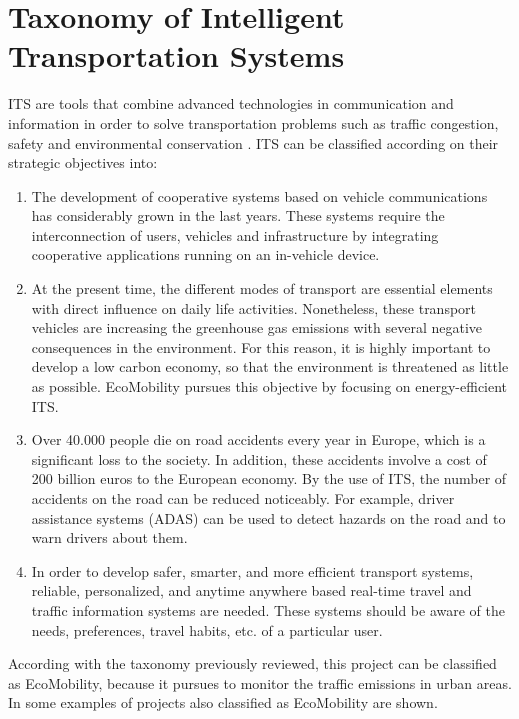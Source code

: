\section{Taxonomy of Intelligent Transportation Systems}
\ac{ITS} are tools that combine advanced technologies in communication and information in order to solve transportation problems such as traffic congestion, safety and environmental conservation \cite{San15}. \ac{ITS} can be classified according on their strategic objectives \cite{Rafiq201345} into:
\begin{enumerate}
	\item {} The development of cooperative systems based on vehicle communications has considerably grown in the last years. These systems require the interconnection of users, vehicles and infrastructure by integrating cooperative applications running on an in-vehicle device.
	
	\item {} At the present time, the different modes of transport are essential elements with direct influence on daily life activities. Nonetheless, these transport vehicles are increasing the greenhouse gas emissions with several negative consequences in the environment. For this reason, it is highly important to develop a low carbon economy, so that the environment is threatened as little as possible. EcoMobility pursues this objective by focusing on energy-efficient \ac{ITS}.
	
	\item {} Over 40.000 people die on road accidents every year in Europe, which is a significant loss to the society. In addition, these accidents involve a cost of 200 billion euros to the European economy. By the use of \ac{ITS}, the number of accidents on the road can be reduced noticeably. For example, driver assistance systems (ADAS) can be used to detect hazards on the road and to warn drivers about them.
	
	\item {} In order to develop safer, smarter, and more efficient transport systems, reliable, personalized, and anytime anywhere based real-time travel and traffic information systems are needed. These systems should be aware of the needs, preferences, travel habits, etc. of a particular user.
\end{enumerate}

According with the taxonomy previously reviewed, this project can be classified as EcoMobility, because it pursues to monitor the traffic emissions in urban areas. In \cite{ADASIS,eCo-MOVe, NAVARRO2016314} some examples of projects also classified as EcoMobility are shown.

